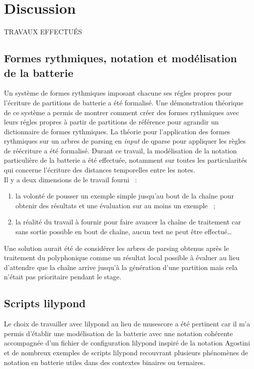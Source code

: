\section{Discussion}

TRAVAUX EFFECTUÉS
\subsection*{Formes rythmiques, notation et modélisation de la batterie}
Un système de formes rythmiques imposant chacune ses régles propres pour
l’écriture de partitions de batterie a été formalisé. Une démonstration
théorique de ce système a permis de montrer comment créer des formes rythmiques
avec leurs régles propres
à partir de partitions de référence pour agrandir un dictionnaire de formes
rythmiques. La théorie pour l’application des formes rythmiques sur un arbres
de parsing en \textit{input} de qparse pour appliquer les règles de réécriture
a été formalisé. Durant ce travail, la modélisation de la notation particulière
de la batterie a été effectuée, notamment sur toutes les particularités qui
concerne l’écriture des distances temporelles entre les notes.\\

Il y a deux dimensions de le travail fourni~ :
\begin{enumerate}
    \item la volonté de pousser un exemple simple jusqu’au bout de la chaîne
        pour obtenir des résultats et une évaluation sur au moins un exemple~ ;
    \item la réalité du travail à fournir pour faire avancer la chaîne de
        traitement car sans sortie possible en bout de chaîne, aucun test ne
        peut être effectué…
\end{enumerate}

Une solution aurait été de considérer les arbres de parsing obtenus après le
traitement du polyphonique comme un résultat local possible à évaluer au lieu
d’attendre que la chaîne arrive jusqu’à la génération d’une partition mais cela
n’était pas prioritaire pendant le stage.

\subsection*{Scripts lilypond}
Le choix de travailler avec lilypond au lieu de musescore a été pertinent car
il m’a permis d’établir une modélisation de la batterie avec une notation
cohérente accompagnée d’un fichier de configuration lilypond inspiré de la
notation Agostini et de nombreux exemples de scripts lilypond recouvrant
plusieurs phénomènes de notation en batterie utiles dans des contextes binaires
ou ternaires.


